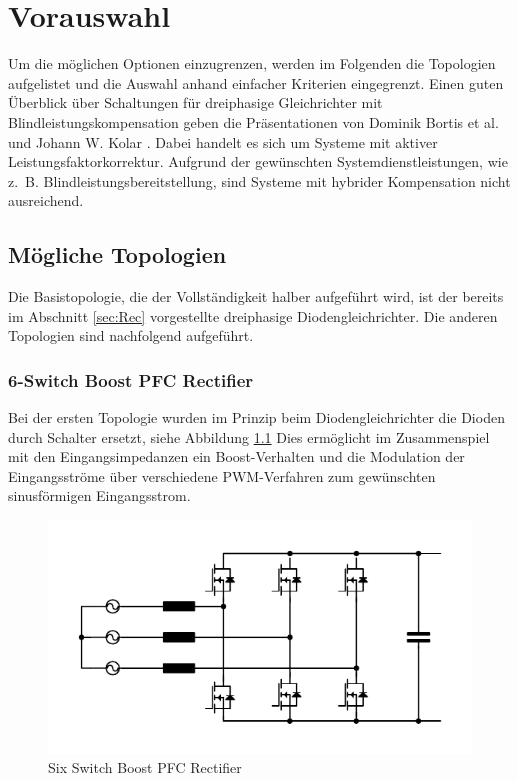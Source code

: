 \chapter{Vorauswahl}
Um die möglichen Optionen einzugrenzen, werden im Folgenden die Topologien aufgelistet und die Auswahl anhand einfacher Kriterien eingegrenzt. Einen guten Überblick über Schaltungen für dreiphasige Gleichrichter mit Blindleistungskompensation geben die Präsentationen von Dominik Bortis et al. \cite{Advanced3PhPFC} und Johann W. Kolar \cite{Essenceof3pKolar}. Dabei handelt es sich um Systeme mit aktiver Leistungsfaktorkorrektur. Aufgrund der gewünschten Systemdienstleistungen, wie z.~B. Blindleistungsbereitstellung, sind Systeme mit hybrider Kompensation nicht ausreichend.

\section{Mögliche Topologien}
Die Basistopologie, die der Vollständigkeit halber aufgeführt wird, ist der bereits im Abschnitt \ref{sec:Rec} vorgestellte dreiphasige Diodengleichrichter. Die anderen Topologien sind nachfolgend aufgeführt.
	\subsection{6-Switch Boost PFC Rectifier}
				Bei der ersten Topologie wurden im Prinzip beim Diodengleichrichter die Dioden durch Schalter ersetzt, siehe Abbildung \ref{fig:sixswitchboost} Dies ermöglicht im Zusammenspiel mit den Eingangsimpedanzen ein Boost-Verhalten und die Modulation der Eingangsströme über verschiedene \gls{PWM}-Verfahren zum gewünschten sinusförmigen Eingangsstrom.
			\begin{figure} [H]
				\centering
				\includegraphics[width=0.9\linewidth]{content/Grafiken/SixSwitchBoost}
				\caption{Six Switch Boost PFC Rectifier}
				\label{fig:sixswitchboost}
			\end{figure}
			
